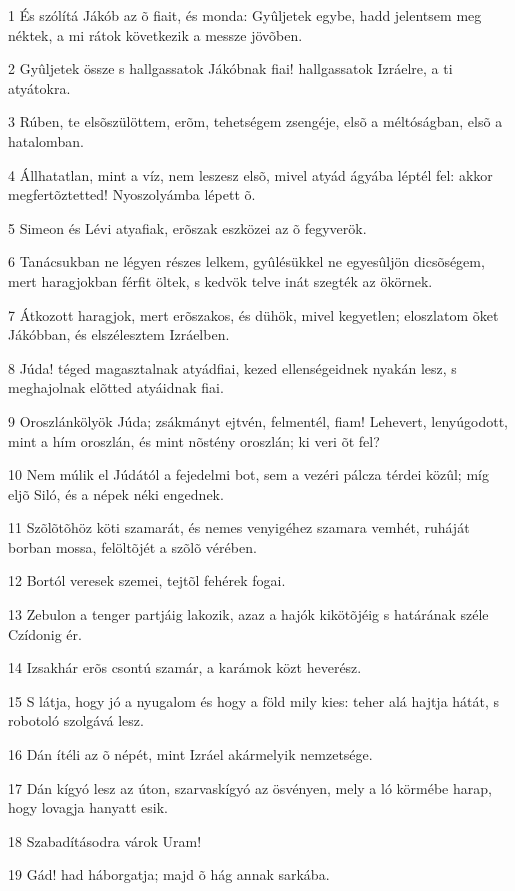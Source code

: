 \par 1 És szólítá Jákób az õ fiait, és monda: Gyûljetek egybe, hadd jelentsem meg néktek, a mi rátok következik a messze jövõben.
\par 2 Gyûljetek össze s hallgassatok Jákóbnak fiai! hallgassatok Izráelre, a ti atyátokra.
\par 3 Rúben, te elsõszülöttem, erõm, tehetségem zsengéje, elsõ a méltóságban, elsõ a hatalomban.
\par 4 Állhatatlan, mint a víz, nem leszesz elsõ, mivel atyád ágyába léptél fel: akkor megfertõztetted! Nyoszolyámba lépett õ.
\par 5 Simeon és Lévi atyafiak, erõszak eszközei az õ fegyverök.
\par 6 Tanácsukban ne légyen részes lelkem, gyûlésükkel ne egyesûljön dicsõségem, mert haragjokban férfit öltek, s kedvök telve inát szegték az ökörnek.
\par 7 Átkozott haragjok, mert erõszakos, és dühök, mivel kegyetlen; eloszlatom õket Jákóbban, és elszélesztem Izráelben.
\par 8 Júda! téged magasztalnak atyádfiai, kezed ellenségeidnek nyakán lesz, s meghajolnak elõtted atyáidnak fiai.
\par 9 Oroszlánkölyök Júda; zsákmányt ejtvén, felmentél, fiam! Lehevert, lenyúgodott, mint a hím oroszlán, és mint nõstény oroszlán; ki veri õt fel?
\par 10 Nem múlik el Júdától a fejedelmi bot, sem a vezéri pálcza térdei közûl; míg eljõ Siló, és a népek néki engednek.
\par 11 Szõlõtõhöz köti szamarát, és nemes venyigéhez szamara vemhét, ruháját borban mossa, felöltõjét a szõlõ vérében.
\par 12 Bortól veresek szemei, tejtõl fehérek fogai.
\par 13 Zebulon a tenger partjáig lakozik, azaz a hajók kikötõjéig s határának széle Czídonig ér.
\par 14 Izsakhár erõs csontú szamár, a karámok közt heverész.
\par 15 S látja, hogy jó a nyugalom és hogy a föld mily kies: teher alá hajtja hátát, s robotoló szolgává lesz.
\par 16 Dán ítéli az õ népét, mint Izráel akármelyik nemzetsége.
\par 17 Dán kígyó lesz az úton, szarvaskígyó az ösvényen, mely a ló körmébe harap, hogy lovagja hanyatt esik.
\par 18 Szabadításodra várok Uram!
\par 19 Gád! had háborgatja; majd õ hág annak sarkába.
